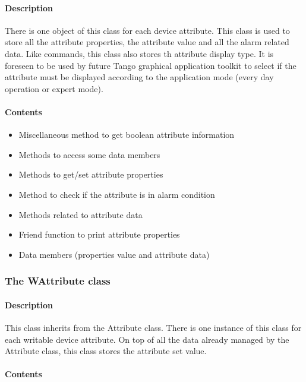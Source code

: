 \paragraph{Description}

There is one object of this class for each device attribute.
This class is used to store all the attribute properties,
the attribute value and all the alarm related data.
Like commands, this class also stores th attribute display type. It
is foreseen to be used by future Tango graphical application toolkit
to select if the attribute must be displayed according to the application
mode (every day operation or expert mode).


\paragraph{Contents}
\begin{itemize}
\item Miscellaneous method to get boolean attribute information
\item Methods to access some data members
\item Methods to get/set attribute properties
\item Method to check if the attribute is in alarm condition
\item Methods related to attribute data
\item Friend function to print attribute properties
\item Data members (properties value and attribute data)
\end{itemize}

\subsubsection{The WAttribute class}


\paragraph{Description}

This class inherits from the Attribute class. There is one instance
of this class for each writable device attribute.
On top of all the data already managed by the Attribute class, this
class stores the attribute set value.


\paragraph{Contents}

